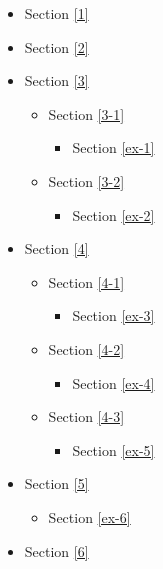 \documentclass[11pt]{article}
\providecommand{\tightlist}{%
      \setlength{\itemsep}{0pt}\setlength{\parskip}{0pt}}
\begin{document}
\begin{itemize}
\tightlist
\item
  Section \ref{1}
\item
  Section \ref{2}
\item
  Section \ref{3}

  \begin{itemize}
  \tightlist
  \item
    Section \ref{3-1}

    \begin{itemize}
    \tightlist
    \item
      Section \ref{ex-1}
    \end{itemize}
  \item
    Section \ref{3-2}

    \begin{itemize}
    \tightlist
    \item
      Section \ref{ex-2}
    \end{itemize}
  \end{itemize}
\item
  Section \ref{4}

  \begin{itemize}
  \tightlist
  \item
    Section \ref{4-1}

    \begin{itemize}
    \tightlist
    \item
      Section \ref{ex-3}
    \end{itemize}
  \item
    Section \ref{4-2}

    \begin{itemize}
    \tightlist
    \item
      Section \ref{ex-4}
    \end{itemize}
  \item
    Section \ref{4-3}

    \begin{itemize}
    \tightlist
    \item
      Section \ref{ex-5}
    \end{itemize}
  \end{itemize}
\item
  Section \ref{5}

  \begin{itemize}
  \tightlist
  \item
    Section \ref{ex-6}
  \end{itemize}
\item
  Section \ref{6}


\end{itemize}
\end{document}
